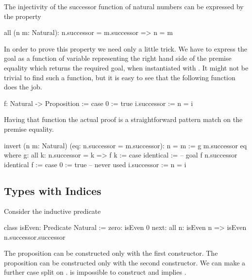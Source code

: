 The injectivity of the successor function of natural numbers can be expressed
by the property

\begin{alba}
    all (n m: Natural): n.successor = m.successor  =>  n = m
\end{alba}

In order to prove this property we need only a little trick. We have to
express the goal  as a function of variable representing the right
hand side of the premise equality which returns the required goal, when
instantiated with . It might not be trivial to find such a
function, but it is easy to see that the following function does the job.

\begin{alba}
    f: Natural -> Proposition :=
        case 0 :=
                true
             i.successor :=
                n = i
\end{alba}
%
Having that function the actual proof is a straightforward pattern match on the
premise equality.


\begin{alba}
    invert (n m: Natural) (eq: n.successor = m.successor): n = m
    :=
        g m.successor eq
        where
            g: all k: n.successor = k => f k :=
                case identical :=
                    -- goal f n.successor
                    identical
            f :=
                case
                    0 :=
                        true -- never used
                    i.successor :=
                        n = i
\end{alba}







\subsection{Types with Indices}

Consider the inductive predicate

\begin{alba}
    class
        isEven: Predicate Natural
    :=
        zero: isEven 0
        next: all n: isEven n => isEven n.successor.successor
\end{alba}

The proposition  can be constructed only with the first
constructor. The proposition  can be constructed only
with the second constructor. We can make a further case split on .
 is impossible to construct and  implies .

